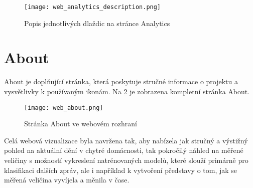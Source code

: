 \begin{figure}[H]
 \centering
  \texttt{[image: web\_analytics\_description.png]}
  \caption{Popis jednotlivých dlaždic na stránce Analytics}
  \label{fig:web_analytics_description}
\end{figure}

\section{About} \label{sec:about}

About je doplňující stránka, která poskytuje stručné informace o projektu a vysvětlivky k používaným ikonám. Na \cref{fig:web_about} je zobrazena kompletní stránka About. 

\begin{figure}[H]
  \centering
  \texttt{[image: web\_about.png]}
  \caption{Stránka About ve webovém rozhraní}
  \label{fig:web_about}
\end{figure}

Celá webová vizualizace byla navržena tak, aby nabízela jak stručný a výstižný pohled na aktuální dění v chytré domácnosti, tak pokročilý náhled na měřené veličiny s možností vykreslení natrénovaných modelů, které slouží primárně pro klasifikaci dalších zpráv, ale i například k vytvoření představy o tom, jak se měřená veličina vyvíjela a měnila v čase.